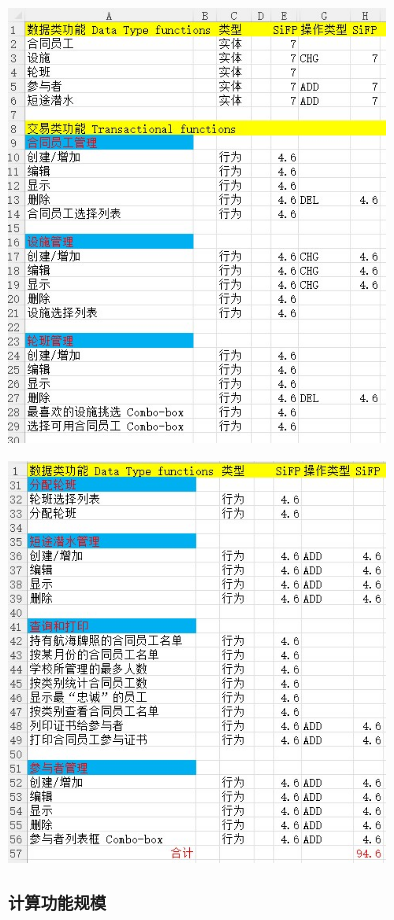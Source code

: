 \includegraphics[width=10cm]{Ex2XlsScreenshot_2022-04-05_143941.jpg}


\includegraphics[width=10cm]{Ex2XlsPt2of2Screenshot_2022-04-05_143941.jpg}

\hypertarget{ux8ba1ux7b97ux529fux80fdux89c4ux6a21-1}{%
\subsubsection{计算功能规模}\label{ux8ba1ux7b97ux529fux80fdux89c4ux6a21-1}}


